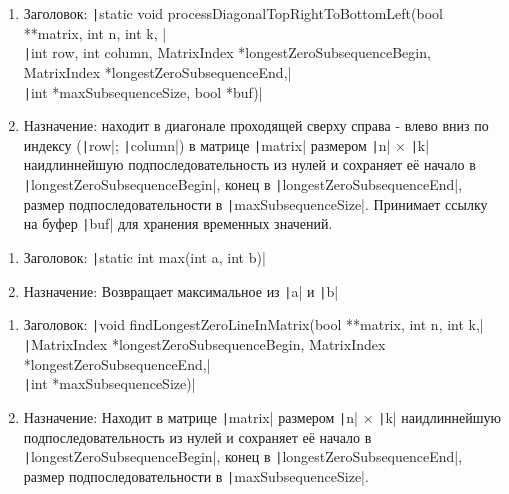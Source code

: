 \documentclass[a4paper, 12pt, oneside]{article}
\begin{document}
    \hline
    \begin{enumerate}
        \item Заголовок:  \texttt|static void processDiagonalTopRightToBottomLeft(bool **matrix, int n, int k, |\\
        \texttt|int row, int column, MatrixIndex *longestZeroSubsequenceBegin, MatrixIndex *longestZeroSubsequenceEnd,|\\
        \texttt|int *maxSubsequenceSize, bool *buf)|
        \item Назначение: находит в диагонале проходящей сверху справа - влево вниз по индексу (\texttt|row|; \texttt|column|)
        в матрице \texttt|matrix| размером \texttt|n| $\times$ \texttt|k| наидлиннейшую
        подпоследовательность из нулей и сохраняет её начало в
        \texttt|longestZeroSubsequenceBegin|, конец в \texttt|longestZeroSubsequenceEnd|, размер подпоследовательности в
        \texttt|maxSubsequenceSize|.
        Принимает ссылку на буфер \texttt|buf| для хранения временных значений.
    \end{enumerate}
    \hline
    \begin{enumerate}
        \item Заголовок:  \texttt|static int max(int a, int b)|
        \item Назначение: Возвращает максимальное из \texttt|a| и \texttt|b|
    \end{enumerate}
    \hline
    \begin{enumerate}
        \item Заголовок:  \texttt|void findLongestZeroLineInMatrix(bool **matrix, int n, int k,|\\
        \texttt|MatrixIndex *longestZeroSubsequenceBegin, MatrixIndex *longestZeroSubsequenceEnd,|\\
        \texttt|int *maxSubsequenceSize)|
        \item Назначение: Находит в матрице \texttt|matrix| размером \texttt|n| $\times$ \texttt|k|
        наидлиннейшую
        подпоследовательность из нулей и сохраняет её начало в
        \texttt|longestZeroSubsequenceBegin|, конец в \texttt|longestZeroSubsequenceEnd|, размер подпоследовательности в
        \texttt|maxSubsequenceSize|.
    \end{enumerate}
\end{document}
